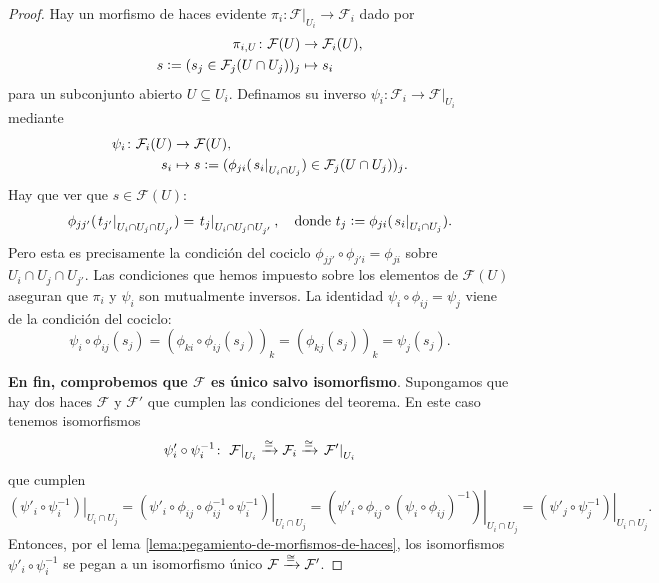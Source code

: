 \documentclass{article}
\numberwithin{equation}{section}
\theoremstyle{definition}
\begin{document}
\begin{proof}
  Hay un morfismo de haces evidente
  $\pi_i\colon \left.\mathcal{F}\right|_{U_i} \to \mathcal{F}_i$ dado por
  \begin{align*}
    \pi_{i,U}\colon \mathcal{F} (U) & \to \mathcal{F}_i (U),\\
    s \mathrel{\mathop:}= (s_j \in \mathcal{F}_j (U \cap U_j))_j & \mapsto s_i
  \end{align*}
  para un subconjunto abierto $U \subseteq U_i$. Definamos su inverso
  $\psi_i\colon \mathcal{F}_i \to \left.\mathcal{F}\right|_{U_i}$ mediante
  \begin{align*}
    \psi_i\colon \mathcal{F}_i (U) & \to \mathcal{F} (U),\\
    s_i & \mapsto s \mathrel{\mathop:}= (\phi_{ji} (\left.s_i\right|_{U_i \cap U_j}) \in \mathcal{F}_j (U \cap U_j))_j.
  \end{align*}
  Hay que ver que $s \in \mathcal{F} (U)$:
  \[ \phi_{jj'} (\left.t_{j'}\right|_{U_i\cap U_j \cap U_{j'}}) =
     \left.t_j\right|_{U_i\cap U_j \cap U_{j'}},
     \quad\text{donde }t_j \mathrel{\mathop:}= \phi_{ji} (\left.s_i\right|_{U_i \cap U_j}). \]
  Pero esta es precisamente la condición del cociclo
  $\phi_{jj'} \circ \phi_{j'i} = \phi_{ji}$ sobre $U_i \cap U_j \cap
  U_{j'}$. Las condiciones que hemos impuesto sobre los elementos de
  $\mathcal{F} (U)$ aseguran que $\pi_i$ y $\psi_i$ son mutualmente inversos. La
  identidad $\psi_i \circ \phi_{ij} = \psi_j$ viene de la condición del cociclo:
  \[ \psi_i \circ \phi_{ij} (s_j) =
     (\phi_{ki} \circ \phi_{ij} (s_j))_k =
     (\phi_{kj} (s_j))_k = \psi_j (s_j). \]

  \vspace{1em}

  \textbf{En fin, comprobemos que $\mathcal{F}$ es único salvo
    isomorfismo}. Supongamos que hay dos haces $\mathcal{F}$ y $\mathcal{F}'$
  que cumplen las condiciones del teorema. En este caso tenemos isomorfismos
  $$\psi'_i\circ \psi_i^{-1}\colon \left.\mathcal{F}\right|_{U_i}
  \xrightarrow{\cong} \mathcal{F}_i
  \xrightarrow{\cong} \left.\mathcal{F}'\right|_{U_i}$$
  que cumplen
  $$\left.(\psi'_i\circ \psi_i^{-1})\right|_{U_i \cap U_j} =
  \left.(\psi'_i\circ \phi_{ij} \circ \phi_{ij}^{-1} \circ \psi_i^{-1})\right|_{U_i \cap U_j} =
  \left.(\psi'_i\circ \phi_{ij} \circ (\psi_i \circ \phi_{ij})^{-1})\right|_{U_i \cap U_j} =
  \left.(\psi'_j \circ \psi_j^{-1})\right|_{U_i \cap U_j}.$$
  Entonces, por el lema \ref{lema:pegamiento-de-morfismos-de-haces},
  los isomorfismos $\psi'_i\circ \psi_i^{-1}$ se pegan a un isomorfismo único
  $\mathcal{F} \xrightarrow{\cong} \mathcal{F}'$.
\end{proof}
\end{document}
